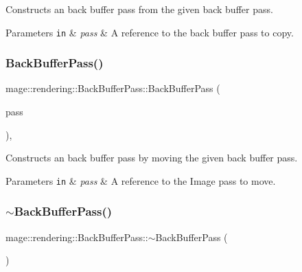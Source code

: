 Constructs an back buffer pass from the given back buffer pass.


\begin{DoxyParams}[1]{Parameters}
\mbox{\tt in}  & {\em pass} & A reference to the back buffer pass to copy. \\
\hline
\end{DoxyParams}
\mbox{\label{classmage_1_1rendering_1_1_back_buffer_pass_ac8dfbaabb766f4bfd61cfea8d01dd7dc}} 
\subsubsection{\texorpdfstring{Back\+Buffer\+Pass()}{BackBufferPass()}\hspace{0.1cm}{\footnotesize\ttfamily [3/3]}}
{\footnotesize\ttfamily mage\+::rendering\+::\+Back\+Buffer\+Pass\+::\+Back\+Buffer\+Pass (\begin{DoxyParamCaption}\item[{\mbox{\hyperlink{classmage_1_1rendering_1_1_back_buffer_pass}{Back\+Buffer\+Pass}} \&\&}]{pass }\end{DoxyParamCaption})\hspace{0.3cm}{\ttfamily [default]}, {\ttfamily [noexcept]}}

Constructs an back buffer pass by moving the given back buffer pass.


\begin{DoxyParams}[1]{Parameters}
\mbox{\tt in}  & {\em pass} & A reference to the Image pass to move. \\
\hline
\end{DoxyParams}
\mbox{\label{classmage_1_1rendering_1_1_back_buffer_pass_a697a5e094cdcdf9f42dd2efdda957b57}} 
\subsubsection{\texorpdfstring{$\sim$\+Back\+Buffer\+Pass()}{~BackBufferPass()}}
{\footnotesize\ttfamily mage\+::rendering\+::\+Back\+Buffer\+Pass\+::$\sim$\+Back\+Buffer\+Pass (\begin{DoxyParamCaption}{ }\end{DoxyParamCaption})\hspace{0.3cm}{\ttfamily [default]}}


